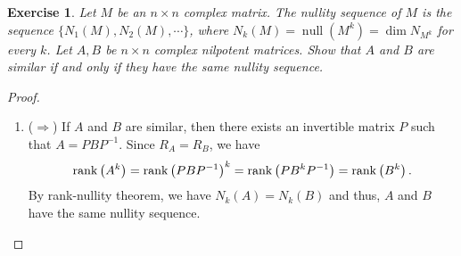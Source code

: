 \documentclass[11pt]{article}
\newtheorem{exercise}{Exercise}[section]
\theoremstyle{definition}
\numberwithin{equation}{subsection}
\begin{document}
\begin{exercise}
Let $M$ be an $n \times n$ complex matrix. The nullity sequence of $M$ is the sequence $\{N_1(M), N_2(M), \cdots\}$, where $N_k(M) = \operatorname{null} (M^k) = \dim N_{M^k}$ for every $k$. Let $A, B$ be $n \times n$ complex nilpotent matrices. Show that $A$ and $B$ are similar if and only if they have the same nullity sequence.
\end{exercise}
\begin{proof}
~\begin{enumerate}[label=(\alph*)]
    \item ($\Rightarrow$) If $A$ and $B$ are similar, then there exists an invertible matrix $P$ such that $A = PBP^{-1}$. Since $R_A = R_B$, we have
    \begin{align*}
        \rank \left(A^k\right) = \rank \left(PBP^{-1}\right)^k = \rank \left(PB^kP^{-1}\right) = \rank \left(B^k\right).
    \end{align*}
    By rank-nullity theorem, we have $N_k(A) = N_k(B)$ and thus, $A$ and $B$ have the same nullity sequence.
    

\end{enumerate}
\end{proof}
\end{document}
